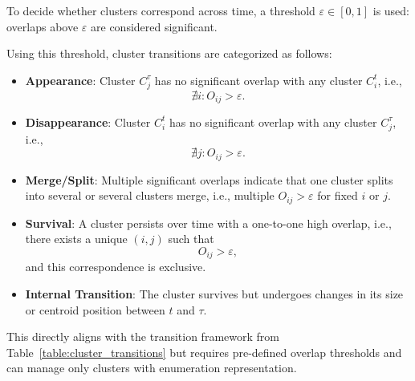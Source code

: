 To decide whether clusters correspond across time, a threshold $ \varepsilon \in
    [0,1] $ is used: overlaps above $ \varepsilon $ are considered significant.

Using this threshold, cluster transitions are categorized as follows:

\begin{itemize}
    \item \textbf{Appearance}: Cluster $ C_j^{\tau} $ has no significant overlap with any cluster $ C_i^t $, i.e.,
          \[
              \nexists i: O_{ij} > \varepsilon.
          \]

    \item \textbf{Disappearance}: Cluster $ C_i^t $ has no significant overlap with any cluster $ C_j^{\tau} $, i.e.,
          \[
              \nexists j: O_{ij} > \varepsilon.
          \]

    \item \textbf{Merge/Split}: Multiple significant overlaps indicate that one cluster splits into several or several clusters merge, i.e., multiple $ O_{ij} > \varepsilon $ for fixed $ i $ or $ j $.

    \item \textbf{Survival}: A cluster persists over time with a one-to-one high overlap, i.e., there exists a unique $ (i,j) $ such that
          \[
              O_{ij} > \varepsilon,
          \]
          and this correspondence is exclusive.

    \item \textbf{Internal Transition}: The cluster survives but undergoes changes in its size or centroid position between $ t $ and $ \tau $.
\end{itemize}

This directly aligns with the transition framework from
Table~\ref{table:cluster_transitions} but requires pre-defined overlap
thresholds and can manage only clusters with enumeration representation.

